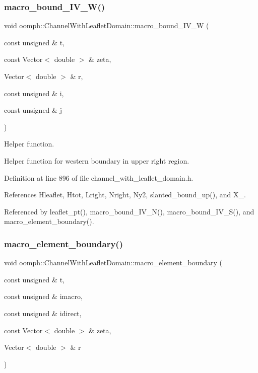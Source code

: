 \subsubsection{\texorpdfstring{macro\+\_\+bound\+\_\+\+I\+V\+\_\+\+W()}{macro\_bound\_IV\_W()}}
{\footnotesize\ttfamily void oomph\+::\+Channel\+With\+Leaflet\+Domain\+::macro\+\_\+bound\+\_\+\+I\+V\+\_\+W (\begin{DoxyParamCaption}\item[{const unsigned \&}]{t,  }\item[{const Vector$<$ double $>$ \&}]{zeta,  }\item[{Vector$<$ double $>$ \&}]{r,  }\item[{const unsigned \&}]{i,  }\item[{const unsigned \&}]{j }\end{DoxyParamCaption})\hspace{0.3cm}{\ttfamily [protected]}}



Helper function. 

Helper function for western boundary in upper right region. 

Definition at line 896 of file channel\+\_\+with\+\_\+leaflet\+\_\+domain.\+h.



References Hleaflet, Htot, Lright, Nright, Ny2, slanted\+\_\+bound\+\_\+up(), and X\+\_.



Referenced by leaflet\+\_\+pt(), macro\+\_\+bound\+\_\+\+I\+V\+\_\+\+N(), macro\+\_\+bound\+\_\+\+I\+V\+\_\+\+S(), and macro\+\_\+element\+\_\+boundary().

\mbox{\label{classoomph_1_1ChannelWithLeafletDomain_ae4b123847f4ab6e242a0409d72fe5cbd}} 
\subsubsection{\texorpdfstring{macro\+\_\+element\+\_\+boundary()}{macro\_element\_boundary()}}
{\footnotesize\ttfamily void oomph\+::\+Channel\+With\+Leaflet\+Domain\+::macro\+\_\+element\+\_\+boundary (\begin{DoxyParamCaption}\item[{const unsigned \&}]{t,  }\item[{const unsigned \&}]{imacro,  }\item[{const unsigned \&}]{idirect,  }\item[{const Vector$<$ double $>$ \&}]{zeta,  }\item[{Vector$<$ double $>$ \&}]{r }\end{DoxyParamCaption})}



